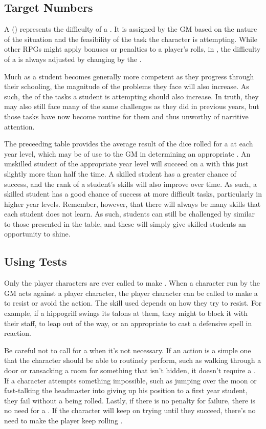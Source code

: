 \subsection{Target Numbers}

A {\targetnumber} ({\tn}) represents the difficulty of a {\test}.
It is assigned by the GM based on the nature of the situation and the feasibility of the task the character is attempting.
While other RPGs might apply bonuses or penalties to a player's rolls, in , the difficulty of a {\test} is always adjusted by changing by the {\tn}.

Much as a student becomes generally more competent as they progress through their schooling, the magnitude of the problems they face will also increase.
As such, the {\tns} of the tasks a student is attempting should also increase.
In truth, they may also still face many of the same challenges as they did in previous years, but those tasks have now become routine for them and thus unworthy of narritive attention.

The preceeding table provides the average result of the dice rolled for a {\test} at each year level, which may be of use to the GM in determining an appropriate {\tn}.
An unskilled student of the appropriate year level will succeed on a {\test} with this {\tn} just slightly more than half the time.
A skilled student has a greater chance of success, and the rank of a student's skills will also improve over time.
As such, a skilled student has a good chance of success at more difficult tasks, particularly in higher year levels.
Remember, however, that there will always be many skills that each student does not learn.
As such, students can still be challenged by {\tns} similar to those presented in the table, and these will simply give skilled students an opportunity to shine.

\subsection{Using Tests}

Only the player characters are ever called to make {\tests}.
When a character run by the GM acts against a player character, the player character can be called to make a {\test} to resist or avoid the action.
The skill used depends on how they try to resist.
For example, if a hippogriff swings its talons at them, they might {\test}  to block it with their staff, {\test}  to leap out of the way, or {\test} an appropriate {\magicskill} to cast a defensive spell in reaction.

Be careful not to call for a {\test} when it's not necessary.
If an action is a simple one that the character should be able to routinely perform, such as walking through a door or ransacking a room for something that isn't hidden, it doesn't require a {\test}.
If a character attempts something impossible, such as jumping over the moon or fast-talking the headmaster into giving up his position to a first year student, they fail without a {\test} being rolled.
Lastly, if there is no penalty for failure, there is no need for a {\test}.
If the character will keep on trying until they succeed, there's no need to make the player keep rolling {\tests}.
